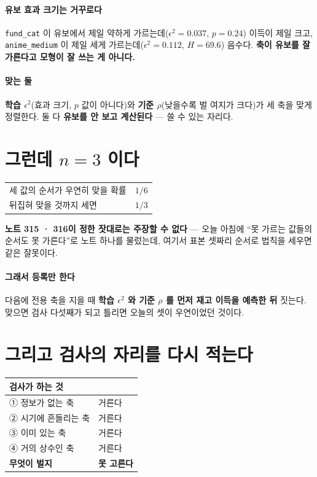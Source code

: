 \documentclass[10pt]{article}
\begin{document}
\paragraph{유보 효과 크기는 거꾸로다} \texttt{fund\_cat} 이 유보에서
제일 약하게 가르는데($\epsilon^2{=}0.037$, $p{=}0.24$) 이득이 제일 크고,
\texttt{anime\_medium} 이 제일 세게 가르는데($\epsilon^2{=}0.112$,
$H{=}69.6$) 음수다. \textbf{축이 유보를 잘 가른다고 모형이 잘 쓰는 게
아니다.}

\paragraph{맞는 둘} \textbf{학습 $\epsilon^2$}(효과 크기, $p$ 값이 아니다)와
\textbf{기준 $\rho$}(낮을수록 벌 여지가 크다)가 세 축을 맞게 정렬한다.
둘 다 \textbf{유보를 안 보고 계산된다} --- 쓸 수 있는 자리다.

\section{그런데 $n{=}3$ 이다}

\begin{center}\small
\begin{tabular}{ll}
\hline
세 값의 순서가 우연히 맞을 확률 & $1/6$ \\
뒤집혀 맞을 것까지 세면 & $1/3$ \\
\hline
\end{tabular}
\end{center}

\textbf{노트 315 · 316이 정한 잣대로는 주장할 수 없다} --- 오늘 아침에
``못 가르는 값들의 순서도 못 가른다''로 노트 하나를 물렀는데, 여기서 표본
셋짜리 순서로 법칙을 세우면 같은 잘못이다.

\paragraph{그래서 등록만 한다} 다음에 전용 축을 지을 때 \textbf{학습
$\epsilon^2$ 와 기준 $\rho$ 를 먼저 재고 이득을 예측한 뒤} 짓는다. 맞으면
검사 다섯째가 되고 틀리면 오늘의 셋이 우연이었던 것이다.

\section{그리고 검사의 자리를 다시 적는다}

\begin{center}\footnotesize
\begin{tabular}{ll}
\hline
검사가 하는 것 & \\
\hline
① 정보가 없는 축 & 거른다 \\
② 시기에 흔들리는 축 & 거른다 \\
③ 이미 있는 축 & 거른다 \\
④ 거의 상수인 축 & 거른다 \\
\hline
\textbf{무엇이 벌지} & \textbf{못 고른다} \\
\hline
\end{tabular}
\end{center}
\end{document}

